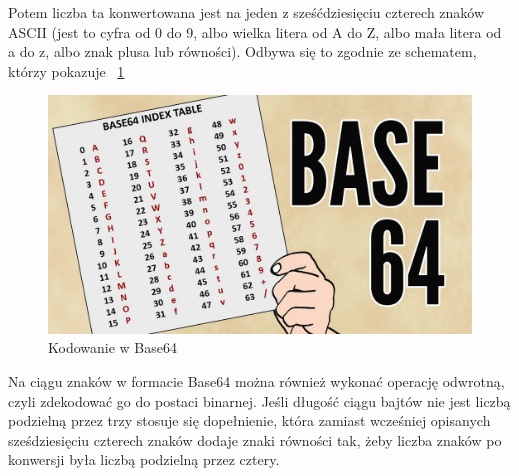 Potem liczba ta konwertowana jest na jeden z sześćdziesięciu czterech znaków ASCII (jest to cyfra od 0 do 9, albo wielka litera od A do Z, albo mała litera od a do z, albo znak plusa lub równości). Odbywa się to zgodnie ze schematem, którzy pokazuje \figurename{~\ref{fig:Base64Coding}}
\begin{figure}[H]
    \centering
    \includegraphics[width=\textwidth]{Images/Base64Coding.jpg}
    \caption{Kodowanie w Base64}
	\label{fig:Base64Coding}
\end{figure}
Na ciągu znaków w formacie Base64 można również wykonać operację odwrotną, czyli zdekodować go do postaci binarnej. Jeśli długość ciągu bajtów nie jest liczbą podzielną przez trzy stosuje się dopełnienie, która zamiast wcześniej opisanych sześdziesięciu czterech znaków dodaje znaki równości tak, żeby liczba znaków po konwersji była liczbą podzielną przez cztery.